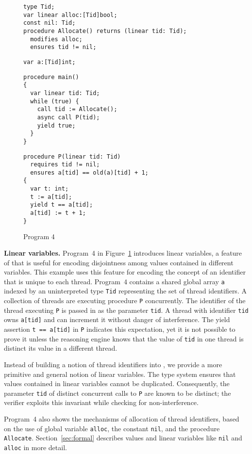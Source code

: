 \begin{figure}
\begin{verbatim}
type Tid;
var linear alloc:[Tid]bool;
const nil: Tid;
procedure Allocate() returns (linear tid: Tid);
  modifies alloc;
  ensures tid != nil;
\end{verbatim}
\begin{verbatim}
var a:[Tid]int;
\end{verbatim}
\begin{verbatim}
procedure main()
{
  var linear tid: Tid;
  while (true) {
    call tid := Allocate();
    async call P(tid);
    yield true;
  }
}
\end{verbatim}
\begin{verbatim}
procedure P(linear tid: Tid)
  requires tid != nil;
  ensures a[tid] == old(a)[tid] + 1;
{
  var t: int;
  t := a[tid];
  yield t == a[tid];
  a[tid] := t + 1;
}
\end{verbatim}
\caption{Program 4}
\label{fig:ex5}
\end{figure}

{\bf Linear variables.}
Program~4 in Figure~\ref{fig:ex5} introduces linear variables, a feature of \civl 
that is useful for encoding disjointness among values contained in 
different variables.  
This example uses this feature for encoding the concept of an identifier 
that is unique to each thread.
Program~4 contains a shared global array {\tt a} indexed by an uninterpreted type {\tt Tid} 
representing the set of thread identifiers.
A collection of threads are executing procedure {\tt P} concurrently.
The identifier of the thread executing {\tt P} is passed in as the parameter {\tt tid}.
A thread with identifier {\tt tid} owns {\tt a[tid]} and can increment it without danger of interference.
The yield assertion {\tt t == a[tid]} in {\tt P} indicates this expectation, yet it is not possible to prove it 
unless the reasoning engine knows that the value of {\tt tid} in one thread is distinct 
its value in a different thread.

Instead of building a notion of thread identifiers into \civl, we provide a more 
primitive and general notion of linear variables.
The \civl type system ensures that values contained in linear variables cannot be duplicated.
Consequently, the parameter {\tt tid} of distinct concurrent calls to {\tt P} are known to be distinct;
the \civl verifier exploits this invariant while checking for non-interference.

Program~4 also shows the mechanisms of allocation of thread identifiers,
based on the use of global variable {\tt alloc}, the constant {\tt nil}, and the procedure 
{\tt Allocate}.  
Section~\ref{sec:formal} describes values and linear variables like {\tt nil} and {\tt alloc} in more detail.

